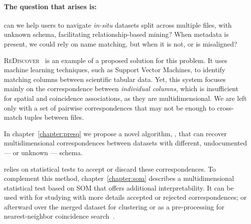 \paragraph{The question that arises is:} can we help users to navigate \textit{in-situ} datasets
split across multiple files, with unknown schema, facilitating relationship-based mining?
When metadata is present, we could rely on name matching, but when it is not, or is misaligned?

\textsc{ReDiscover}~\cite{alawini2016} is an example of a proposed solution for this problem.
It uses machine learning techniques, such as Support Vector Machines, to identify matching
columns between scientific tabular data.
Yet, this system focuses mainly on the correspondence between \emph{individual columns},
which is insufficient for spatial and coincidence associations, as they are multidimensional.
We are left only with a set of pairwise correspondences that may not be enough to cross-match
tuples between files.

In chapter~\ref{chapter:presq} we propose a novel algorithm, \PresQ, that can recover
multidimensional correspondences between datasets with different, undocumented --- or unknown --- schema.

\PresQ relies on statistical tests to accept or discard these correspondences.
To complement this method, chapter~\ref{chapter:som} describes a multidimensional
statistical test based on \gls{SOM} that offers additional interpretability. It can be used
with \PresQ for studying with more details accepted or rejected correspondences;
or afterward over the merged dataset for clustering or as a pre-processing for nearest-neighbor
coincidence search~\cite{silva2011som}.


